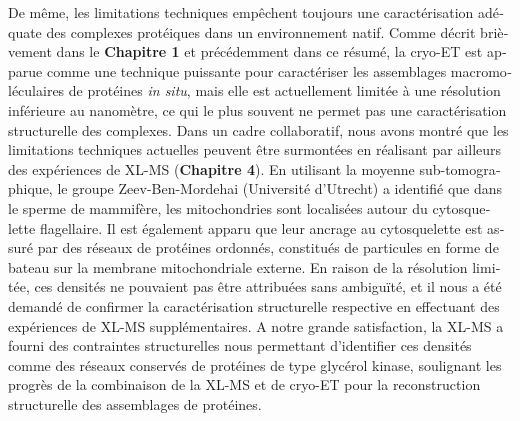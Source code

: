 \begin{otherlanguage}{french}
    De même, les limitations techniques empêchent toujours une caractérisation adéquate des complexes protéiques dans un environnement natif. Comme décrit brièvement dans le \textbf{Chapitre 1} et précédemment dans ce résumé, la cryo-ET est apparue comme une technique puissante pour caractériser les assemblages macromoléculaires de protéines \emph{in situ}, mais elle est actuellement limitée à une résolution inférieure au nanomètre, ce qui le plus souvent ne permet pas une caractérisation structurelle des complexes. Dans un cadre collaboratif, nous avons montré que les limitations techniques actuelles peuvent être surmontées en réalisant par ailleurs des expériences de XL-MS (\textbf{Chapitre 4}). En utilisant la moyenne sub-tomographique, le groupe Zeev-Ben-Mordehai (Université d'Utrecht) a identifié que dans le sperme de mammifère, les mitochondries sont localisées autour du cytosquelette flagellaire. Il est également apparu que leur ancrage au cytosquelette est assuré par des réseaux de protéines ordonnés, constitués de particules en forme de bateau sur la membrane mitochondriale externe. En raison de la résolution limitée, ces densités ne pouvaient pas être attribuées sans ambiguïté, et il nous a été demandé de confirmer la caractérisation structurelle respective en effectuant des expériences de XL-MS supplémentaires. A notre grande satisfaction, la XL-MS a fourni des contraintes structurelles nous permettant d'identifier ces densités comme des réseaux conservés de protéines de type glycérol kinase, soulignant les progrès de la combinaison de la XL-MS et de cryo-ET pour la reconstruction structurelle des assemblages de protéines.


\end{otherlanguage}

